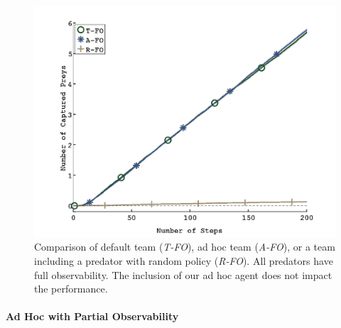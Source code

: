 \begin{figure}[htbp!]
  \centering
  \includegraphics[trim=2.6cm 0.4cm 2.7cm 1.8cm, clip=true, width=0.8\columnwidth]{plots/with_noise/fullObs.png}
  \caption{Comparison of default team (\emph{T-FO}), ad hoc team (\emph{A-FO}), or a team including a predator with random policy (\emph{R-FO}). All predators have full observability. The inclusion of our ad hoc agent does not impact the performance.}
  \label{fig:fullobs}
\end{figure}


\paragraph{Ad Hoc with Partial Observability}

